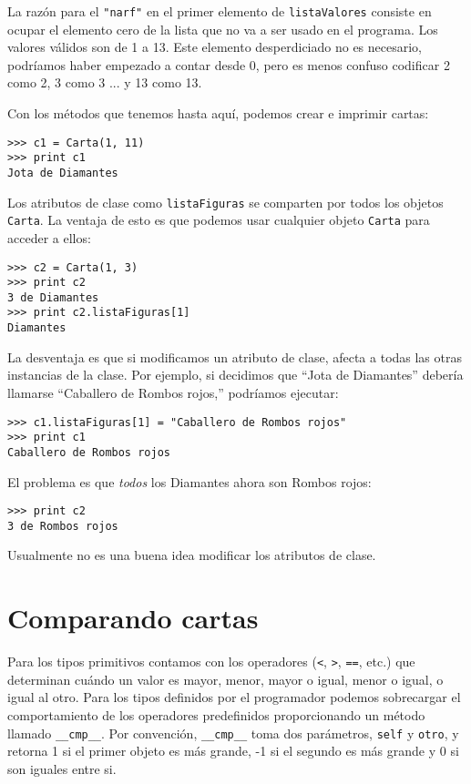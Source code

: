 La razón para el  \texttt{"narf"} en el primer elemento 
de {\tt listaValores} consiste en ocupar el elemento cero de la lista que no 
va a ser usado en el programa. Los valores válidos son de 1 a 13. Este 
elemento desperdiciado no es necesario, podríamos haber empezado a contar
desde 0, pero es menos confuso codificar 2 como 2, 3 como 3 ... y 13 como 13.

Con los métodos que tenemos hasta aquí, podemos crear e imprimir cartas:

\beforeverb
\begin{verbatim}
>>> c1 = Carta(1, 11)
>>> print c1
Jota de Diamantes
\end{verbatim}
\afterverb
%
Los atributos de clase como  \texttt{listaFiguras} se comparten por todos los
objetos \texttt{Carta}. La ventaja de esto es que podemos usar cualquier 
objeto  \texttt{Carta} para acceder a ellos:

\beforeverb
\begin{verbatim}
>>> c2 = Carta(1, 3)
>>> print c2
3 de Diamantes
>>> print c2.listaFiguras[1]
Diamantes
\end{verbatim}
\afterverb
%
La desventaja es que si modificamos un atributo de clase, afecta a todas
las otras instancias de la clase. Por ejemplo, si decidimos que 
``Jota de Diamantes'' debería llamarse ``Caballero de Rombos rojos,'' podríamos ejecutar:


\beforeverb
\begin{verbatim}
>>> c1.listaFiguras[1] = "Caballero de Rombos rojos"
>>> print c1
Caballero de Rombos rojos
\end{verbatim}
\afterverb
%
El problema es que {\em todos} los Diamantes ahora 
son Rombos rojos:

\beforeverb
\begin{verbatim}
>>> print c2
3 de Rombos rojos
\end{verbatim}
\afterverb
%
Usualmente no es una buena idea modificar los atributos de clase.



\section{Comparando cartas}
\label{comparecard}

Para los tipos primitivos contamos con los operadores
(\texttt{<}, \texttt{>}, \texttt{==}, etc.)
que determinan cuándo un valor es mayor, menor, mayor o igual, menor o igual, 
o igual al otro. Para los tipos definidos por el programador podemos sobrecargar 
el comportamiento de los operadores predefinidos proporcionando un método 
llamado \texttt{\_\_cmp\_\_}.  Por convención, \texttt{\_\_cmp\_\_}
toma dos parámetros, \texttt{self} y \texttt{otro}, y  retorna 1 si el primer objeto 
es más grande, -1 si el segundo es más grande y 0 si son iguales entre si.

